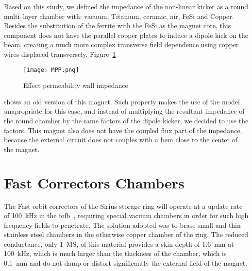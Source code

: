     Based on this study, we defined the impedance of the non-linear kicker as a round multi--layer chamber with: vacuum, Titanium, ceramic, air, FeSi and Copper. Besides the substitution of the ferrite with the FeSi as the magnet core, this component does not have the parallel copper plates to induce a dipole kick on the beam, creating a much more complex transverse field dependence using copper wires displaced transversely. Figure~\ref{fig:non_linear_kicker}
    \begin{figure}[t]
        \centering
        \texttt{[image: MPP.png]}
        \caption{Effect permeability wall impedance}
        \label{fig:non_linear_kicker}
    \end{figure}
    shows an old version of this magnet. Such property makes the use of the \citeauthor{Tsutsui2000} model unapropriate for this case, and instead of multiplying the resultant impedance of the round chamber by the same factors of the dipole kicker, we decided to use the \citeauthor{Yokoya1993} factors. This magnet also does not have the coupled flux part of the impedance, because the external circuit does not couples with a bem close to the center of the magnet.

\section{Fast Correctors Chambers}

    The Fast orbit correctors of the Sirius storage ring will operate at a update rate of \SI{100}{\kilo\hertz} in the \gls{fofb}~\cite{Tavares2013}, requiring special vacuum chambers in order for such high frequency fields to penetrate. The solution adopted was to brase small and thin stainless steel chambers in the otherwise copper chamber of the ring. The reduced conductance, only \SI{1}{\mega\siemens}, of this material provides a skin depth of \SI{1.6}{\milli\meter} at \SI{100}{\kilo\hertz}, which is much larger than the thickness of the chamber, which is \SI{0.1}{\milli\meter} and do not damp or distort significantly the external field of the magnet.

